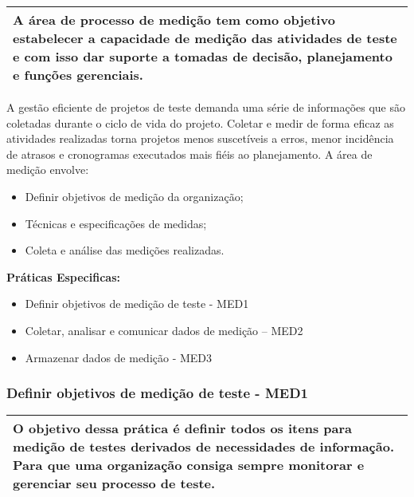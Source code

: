 \begin{table}[H]
\centering
\begin{tabular}{|p{130mm}|}
\hline
A área de processo de medição tem como objetivo estabelecer a capacidade de medição das atividades de teste e com isso dar suporte a tomadas de decisão, planejamento e funções gerenciais. \\ 
\hline
\end{tabular}
\end{table}

A gestão eficiente de projetos de teste demanda uma série de informações que são coletadas durante o ciclo de vida do projeto. Coletar e medir de forma eficaz as atividades realizadas torna projetos menos suscetíveis a erros, menor incidência de atrasos e cronogramas executados mais fiéis ao planejamento. A área de medição envolve:

\begin{itemize}
    \item Definir objetivos de medição da organização;
    \item Técnicas e especificações de medidas;
    \item Coleta e análise das medições realizadas.
\end{itemize}

\textbf{Práticas Especificas: }
\begin{itemize}
    \item Definir objetivos de medição de teste - MED1
    \item Coletar, analisar e comunicar dados de medição – MED2
    \item Armazenar dados de medição - MED3
\end{itemize}

\subsubsection{Definir objetivos de medição de teste - MED1}
\label{sec:med1}

\begin{table}[H]
\centering
\begin{tabular}{|p{130mm}|}
\hline
O objetivo dessa prática é definir todos os itens para medição de testes derivados de necessidades de informação. Para que uma organização consiga sempre monitorar e gerenciar seu processo de teste. \\ 
\hline
\end{tabular}
\end{table}

